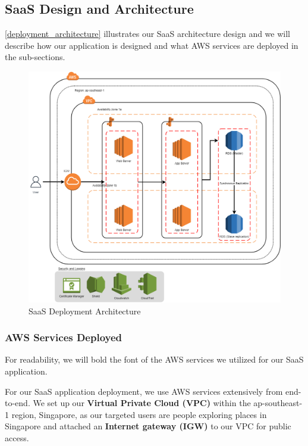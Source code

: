 \documentclass[12pt,a4paper]{article}
\begin{document}
    \subsection{SaaS Design and Architecture}
    \autoref{deployment_architecture} illustrates our SaaS architecture design and we will describe how our application is designed and what AWS services are deployed in the sub-sections.
    
    \begin{figure}[H]
    	\centering
    	\includegraphics[width=1\textwidth]{figures/final.drawio.png}
    	\caption{SaaS Deployment Architecture}
    	\label{deployment_architecture}
    \end{figure}
    
        \subsubsection{AWS Services Deployed}
        \label{section-aws-services-deployed}
        
        For readability, we will bold the font of the AWS services we utilized for our SaaS application.

        For our SaaS application deployment, we use AWS services extensively from end-to-end. We set up our \textbf{Virtual Private Cloud (VPC)} within the ap-southeast-1 region, Singapore, as our targeted users are people exploring places in Singapore and attached an \textbf{Internet gateway (IGW)} to our VPC for public access.
        
\end{document}
